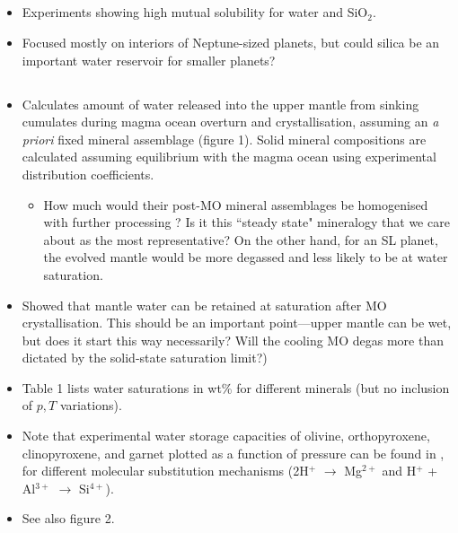 \documentclass{article}
\begin{document}
\subsection{\citet{nisrLargeH2OSolubility2020}}
\begin{itemize}
\item Experiments showing high mutual solubility for water and SiO$_2$.
\item Focused mostly on interiors of Neptune-sized planets, but could silica be an important water reservoir for smaller planets?
\end{itemize}


\subsection{\citet{tikooFateWaterEarth2017}}

\begin{itemize}
\item Calculates amount of water released into the upper mantle from sinking cumulates during magma ocean overturn and crystallisation, assuming an \textit{a priori} fixed mineral assemblage (figure 1). Solid mineral compositions are calculated assuming equilibrium with the magma ocean using experimental distribution coefficients.
\begin{itemize}
\item How much would their post-MO mineral assemblages be homogenised with further processing \citep[e.g.,][]{mauriceOnsetSolidstateMantle2017}? Is it this ``steady state" mineralogy that we care about as the most representative? On the other hand, for an SL planet, the evolved mantle would be more degassed and less likely to be at water saturation.
\end{itemize}
\item Showed that mantle water can be retained at saturation after MO crystallisation. This should be an important point---upper mantle can be wet, but does it start this way necessarily? Will the cooling MO degas more than dictated by the solid-state saturation limit?)
\item Table 1 lists water saturations in wt\% for different minerals (but no inclusion of $p, T$ variations).
\item Note that experimental water storage capacities of olivine, orthopyroxene, clinopyroxene, and garnet plotted as a function of pressure can be found in \citet{hauriPartitioningWaterMelting2006a}, for different molecular substitution mechanisms (2H$^+$ $\rightarrow$ Mg$^{2+}$ and H$^+$ + Al$^{3+}$ $\rightarrow$ Si$^{4+}$).
\item See also \citet{elkins-tantonFormationEarlyWater2011} figure 2.
\end{itemize}
\end{document}
